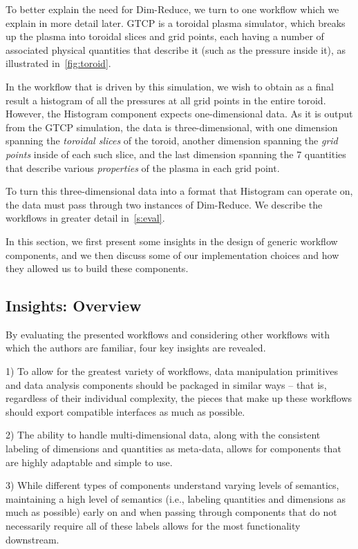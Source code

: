 To better explain the need for Dim-Reduce, we turn to one
workflow which we explain in more detail later.
GTCP is a toroidal plasma simulator,
which breaks up the plasma into toroidal slices and grid points,
each having a number of associated physical quantities
that describe it (such as the pressure inside it), as illustrated
in~\autoref{fig:toroid}.

In the workflow that is driven
by this simulation, we wish to obtain
as a final result a histogram of
all the pressures at all grid points
in the entire toroid.
However, the Histogram component expects
one-dimensional data. As it is output
from the GTCP simulation, the data is
three-dimensional, with one dimension
spanning the \textit{toroidal slices}
of the toroid, another dimension
spanning the \textit{grid points} inside of each such
slice, and the last dimension spanning the
7 quantities that describe
various \textit{properties} of the plasma
in each grid point.

To turn this three-dimensional data
into a format that Histogram can operate
on, the data must pass through two instances
of Dim-Reduce. We describe the workflows
in greater detail in~\autoref{s:eval}.


In this section, we first present
some insights in the design of
generic workflow components,
and we then discuss
some of our implementation choices
and how they allowed us to 
build these components.

\subsection{Insights: Overview}

By evaluating the presented workflows
and considering other workflows with
which the authors are familiar,
four key insights are revealed.

1) To allow for the greatest variety of workflows,
data manipulation primitives and data analysis components
should be packaged in similar ways -- that is,
regardless of their individual complexity,
the pieces that make up these workflows
should export compatible interfaces as much as possible.

2) The ability to handle multi-dimensional data,
along with the consistent labeling of
dimensions and quantities as meta-data,
allows for components that are highly
adaptable and simple to use.

3) While different types of components understand
varying levels of semantics, maintaining a
high level of semantics (i.e., labeling
quantities and dimensions as much
as possible) early on and when passing
through components that do not necessarily
require all of these labels allows for the most
functionality downstream.

